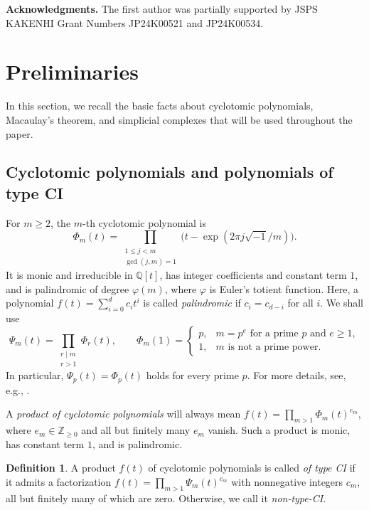 \documentclass[11pt,a4paper]{amsart}
\theoremstyle{definition}
\newtheorem{definition}[definition]{Definition}
\theoremstyle{remark}
\newcommand{\ZZ}{\mathbb Z}
\newcommand{\QQ}{\mathbb Q}
\newcommand{\ph}{\varphi}
\begin{document}
\medskip
\noindent\textbf{Acknowledgments.} The first author was partially supported by JSPS KAKENHI Grant Numbers JP24K00521 and JP24K00534.

\bigskip

\section{Preliminaries}\label{sec:preliminaries}
In this section, we recall the basic facts about cyclotomic polynomials, Macaulay's theorem, and simplicial complexes that will be used throughout the paper.

\subsection{Cyclotomic polynomials and polynomials of type CI}\label{sec:cyclotomic}
For $m\ge2$, the $m$-th cyclotomic polynomial is
\[\Phi_m(t)=\prod_{\substack{1\le j<m\\\gcd(j,m)=1}}\bigl(t-\exp(2\pi j\sqrt{-1}/m)\bigr).\]
It is monic and irreducible in $\QQ[t]$, has integer coefficients and constant term $1$, and is palindromic of degree $\ph(m)$, where $\ph$ is Euler's totient function. Here, a polynomial $f(t)=\sum_{i=0}^d c_it^i$ is called \emph{palindromic} if $c_i=c_{d-i}$ for all $i$. We shall use
\[\Psi_m(t)=\prod_{\substack{r\mid m\\r>1}}\Phi_r(t),\qquad
\Phi_m(1)=\begin{cases}p,&m=p^e\text{ for a prime }p\text{ and }e\ge1,\\1,&m\text{ is not a prime power}.\end{cases}\]
In particular, $\Psi_p(t)=\Phi_p(t)$ holds for every prime $p$. For more details, see, e.g., \cite{Sanna}.

A \emph{product of cyclotomic polynomials} will always mean $f(t)=\prod_{m>1}\Phi_m(t)^{e_m}$, where $e_m\in\ZZ_{\ge0}$ and all but finitely many $e_m$ vanish. Such a product is monic, has constant term $1$, and is palindromic.

\begin{definition}\label{def:type-ci}
A product $f(t)$ of cyclotomic polynomials is called \emph{of type CI} if it admits a factorization $f(t)=\prod_{m>1}\Psi_m(t)^{c_m}$ with nonnegative integers $c_m$, all but finitely many of which are zero. Otherwise, we call it \emph{non-type-CI}.
\end{definition}
\end{document}
